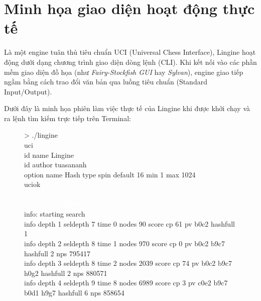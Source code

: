 \section{Minh họa giao diện hoạt động thực tế}

Là một engine tuân thủ tiêu chuẩn UCI (Universal Chess Interface), Lingine hoạt động dưới dạng chương trình giao diện dòng lệnh (CLI). Khi kết nối vào các phần mềm giao diện đồ họa (như \textit{Fairy-Stockfish GUI} hay \textit{Sylvan}), engine giao tiếp ngầm bằng cách trao đổi văn bản qua luồng tiêu chuẩn (Standard Input/Output).

Dưới đây là minh họa phiên làm việc thực tế của Lingine khi được khởi chạy và ra lệnh tìm kiếm trực tiếp trên Terminal:

\begin{figure}[htbp]
    \centering
    \begin{tcolorbox}[
        enhanced,
        colback=black!80!white,
        colframe=black!30!gray,
        colupper=white,
        fontupper=\ttfamily\footnotesize,
        boxrule=1pt,
        arc=3mm,
        title={\texttt{Terminal}},
        coltitle=white,
        toptitle=1.5mm,
        bottomtitle=1.5mm,
        boxsep=2mm
    ]
    \textcolor{green!60!white}{>} ./lingine\\
    \textcolor{gray!70}{uci}\\
    \textcolor{gray!70}{id name Lingine}\\
    \textcolor{gray!70}{id author tuasananh}\\
    \textcolor{gray!70}{option name Hash type spin default 16 min 1 max 1024}\\
    \textcolor{gray!70}{uciok}\\
    \textcolor{white}{position startpos}\\
    \textcolor{white}{go movetime 1000}\\
    \textcolor{gray!70}{info: starting search}\\
    \textcolor{gray!70}{info depth 1 seldepth 7 time 0 nodes 90 score cp 61 pv b0c2 hashfull 1}\\
    \textcolor{gray!70}{info depth 2 seldepth 8 time 1 nodes 970 score cp 0 pv b0c2 b9c7 hashfull 2 nps 795417}\\
    \textcolor{gray!70}{info depth 3 seldepth 8 time 2 nodes 2039 score cp 74 pv b0c2 b9c7 h0g2 hashfull 2 nps 880571}\\
    \textcolor{gray!70}{info depth 4 seldepth 9 time 8 nodes 6989 score cp 3 pv c0e2 b9c7 b0d1 h9g7 hashfull 6 nps 858654}\\

\end{tcolorbox}
\end{figure}
